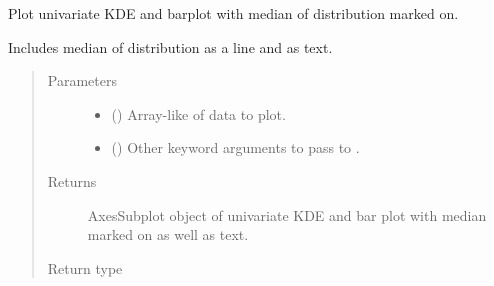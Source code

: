 \documentclass[letterpaper,10pt,english]{sphinxmanual}
\begin{document}
\begin{fulllineitems}
\label{\detokenize{misc:bayescmd.results_handling.diag_kde_plot}}
Plot univariate KDE and barplot with median of distribution marked on.

Includes median of distribution as a line and as text.
\begin{quote}\begin{description}
\item[{Parameters}] \leavevmode\begin{itemize}
\item {} 
 () \textendash{} Array-like of data to plot.

\item {} 
 (\sphinxstyleliteralemphasis{, }) \textendash{} Other keyword arguments to pass to .

\end{itemize}

\item[{Returns}] \leavevmode
{} \textendash{} AxesSubplot object of univariate KDE and bar plot with median marked
on as well as text.

\item[{Return type}] \leavevmode
{}

\end{description}\end{quote}

\end{fulllineitems}

\end{document}
